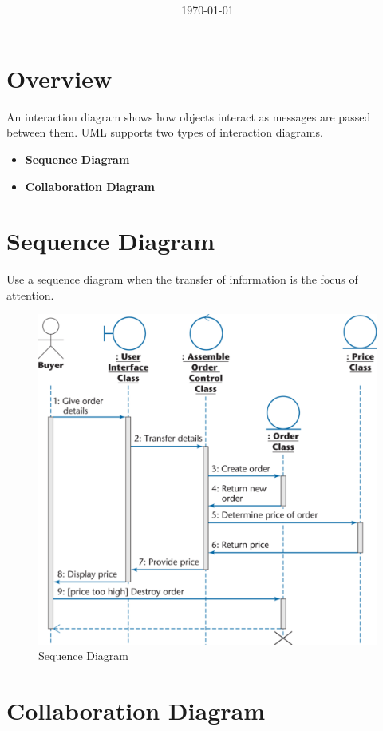 \documentclass[11pt]{article}
\title{\textbf{\Topic}}
\author{\Name}
\date{\today}
\begin{document}
\maketitle
\noindent\makebox[\linewidth]{\rule[8pt]{5in}{0.5pt}}



\section*{Overview}

An interaction diagram shows how objects interact as messages are passed between them. UML supports two types of interaction diagrams.

\begin{itemize}
	\item \textbf{Sequence Diagram}
	\item \textbf{Collaboration Diagram}
\end{itemize}

\section*{Sequence Diagram}

Use a sequence diagram when the transfer of information is the focus of attention.

\begin{figure}[h]
	\centering
	\includegraphics[width=0.7\linewidth]{images/SequenceDiagram.png}
	\caption{Sequence Diagram}
	\label{fig:SequenceDiagram}
\end{figure}

\section*{Collaboration Diagram}
\end{document}
